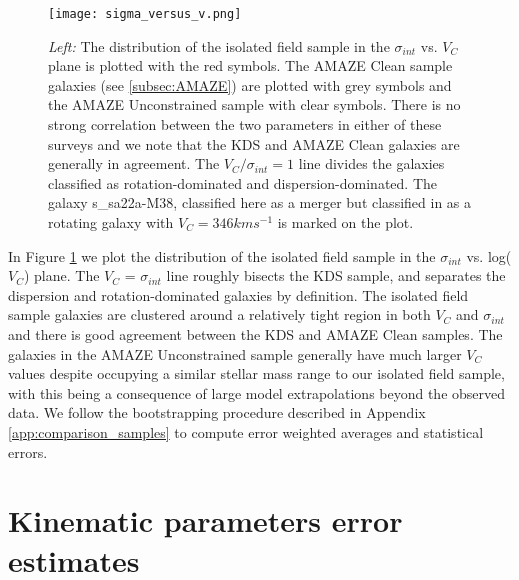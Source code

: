 \documentclass[fleqn,usenatbib]{mn2e}
\begin{document}
\begin{figure}
\centering \hspace{-1.13cm}
\texttt{[image: sigma\_versus\_v.png]}
\caption{{\it Left:} The distribution of the isolated field sample in the $\sigma_{int}$ vs. $V_{C}$ plane is plotted with the red symbols.
The AMAZE Clean sample galaxies (see \protect\cref{subsec:AMAZE}) are plotted with grey symbols and the AMAZE Unconstrained sample with clear symbols.    There is no strong correlation between the two parameters in either of these surveys and we note that the KDS and AMAZE Clean galaxies are generally in agreement.
The $V_{C}/\sigma_{int} = 1$ line divides the galaxies classified as rotation-dominated and dispersion-dominated.
The galaxy s\_sa22a-M38, classified here as a merger but classified in \protect\cite{Gnerucci2011} as a rotating galaxy with $V_{C} = 346kms^{-1}$ is marked on the plot.}
\label{fig:intrinsic_parameters}
\end{figure}

In Figure \ref{fig:intrinsic_parameters} we plot the distribution of the isolated field sample in the $\sigma_{int}$ vs. log($V_{C}$) plane. 
The $V_{C}$ = $\sigma_{int}$ line roughly bisects the KDS sample, and separates the dispersion and rotation-dominated galaxies by definition.
The isolated field sample galaxies are clustered around a relatively tight region in both $V_{C}$ and $\sigma_{int}$ and there is good agreement between the KDS and AMAZE Clean samples.
The galaxies in the AMAZE Unconstrained sample generally have much larger $V_{C}$ values despite occupying a similar stellar mass range to our isolated field sample, with this being a consequence of large model extrapolations beyond the observed data.
We follow the bootstrapping procedure described in Appendix \ref{app:comparison_samples} to compute error weighted averages and statistical errors.

\section{Kinematic parameters error estimates}\label{app:kin_error_estimates}
\end{document}

